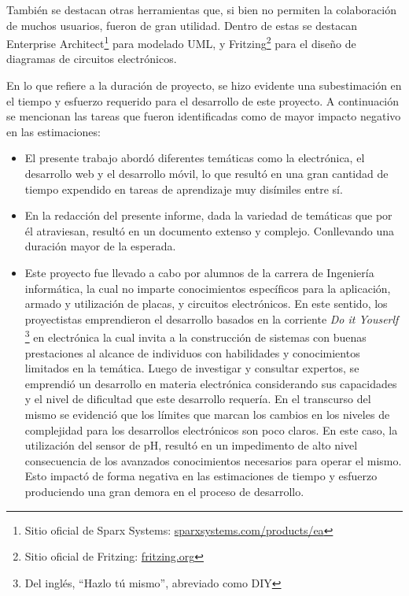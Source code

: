         \par También se destacan otras herramientas que, si bien no permiten la colaboración de muchos usuarios, fueron de gran utilidad. Dentro de estas se destacan Enterprise Architect\footnote{ Sitio oficial de Sparx Systems: \url{sparxsystems.com/products/ea}} para modelado UML, y Fritzing\footnote{ Sitio oficial de Fritzing: \url{fritzing.org}}  para el diseño de diagramas de circuitos electrónicos.
        
        \par En lo que refiere a la duración de proyecto, se hizo evidente una subestimación en el tiempo y esfuerzo requerido para el desarrollo de este proyecto. A continuación se mencionan las tareas que fueron identificadas como de mayor impacto negativo en las estimaciones:
        \begin{itemize}
        
            \item El presente trabajo abordó diferentes temáticas como la electrónica, el desarrollo web y el desarrollo móvil, lo que resultó en una gran cantidad de tiempo expendido en tareas de aprendizaje muy disímiles entre sí.
            
            \item En la redacción del presente informe, dada la variedad de temáticas que por él atraviesan, resultó en un documento extenso y complejo. Conllevando una duración mayor de la esperada. 
            
            \item Este proyecto fue llevado a cabo por alumnos de la carrera de Ingeniería informática, la cual no imparte conocimientos específicos para la aplicación, armado y utilización de placas, y circuitos electrónicos. En este sentido, los proyectistas emprendieron el desarrollo basados en la corriente \textit{Do it Youserlf} \footnote{Del inglés, ``Hazlo tú mismo'', abreviado como DIY} en electrónica la cual invita a la construcción de sistemas con buenas prestaciones al alcance de individuos con habilidades y conocimientos limitados en la temática. Luego de investigar y consultar expertos, se emprendió un desarrollo en materia electrónica considerando sus capacidades y el nivel de dificultad que este desarrollo requería. En el transcurso del mismo se evidenció que los límites que marcan los cambios en los niveles de complejidad para los desarrollos electrónicos son poco claros. En este caso, la utilización del sensor de pH, resultó en un impedimento de alto nivel consecuencia de los avanzados conocimientos necesarios para operar el mismo. Esto impactó de forma negativa en las estimaciones de tiempo y esfuerzo produciendo una gran demora en el proceso de desarrollo.

        \end{itemize}

